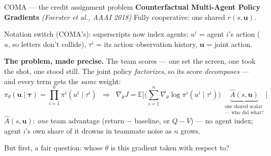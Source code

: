 \documentclass[10pt, aspectratio=169]{beamer}
\newcommand{\paper}[1]{\textcolor{mLightBrown}{\small\textit{(#1)}}}
\begin{document}
\begin{frame}{COMA --- the credit assignment problem}
\textbf{Counterfactual Multi-Agent Policy Gradients} \paper{Foerster et al., AAAI 2018} \quad Fully cooperative: one shared $r(s,\mathbf{u})$.
\smallskip

{\footnotesize\textcolor{mLightBrown}{Notation switch (COMA's): \alert{superscripts now index agents}; $u^i$ = agent $i$'s action ($u$, so letters don't collide), $\tau^i$ = its action--observation history, $\mathbf{u}$ = joint action.}}
\smallskip

\pause
\textbf{The problem, made precise.} The team scores --- one set the screen, one took the shot, one stood still. The joint policy \emph{factorizes}, so its score \emph{decomposes} --- and every term gets the \emph{same} weight:
\[
\pi_\theta(\mathbf{u}\mid\boldsymbol\tau) = \prod_{i=1}^{n}\pi^i(u^i\mid\tau^i)
\;\;\Longrightarrow\;\;
\nabla_{\theta} J = \mathbb{E}\bigg[ \Big( \sum_{i=1}^{n} \nabla_\theta \log \pi^i(u^i\mid\tau^i) \Big)\; \underbrace{\hat A(s,\mathbf{u})}_{\substack{\text{one shared scalar}\\ \text{--- who did what?}}} \bigg]
\]
\pause
$\hat A(s,\mathbf{u})$: \emph{one} team advantage (return $-$ baseline, or $Q-V$) --- \alert{no agent index}; agent $i$'s own share of it drowns in teammate noise as $n$ grows.
\medskip
\pause
\begin{center}
But first, a fair question: \alert{whose $\theta$ is this gradient taken with respect to?}
\end{center}
\end{frame}
\end{document}
